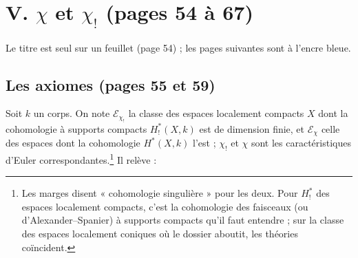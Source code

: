 \documentclass[11pt,a4paper]{article}
\begin{document}
\section*{V. $\chi$ et $\chi_!$ (pages 54 à 67)}

Le titre est seul sur un feuillet (page 54) ; les pages suivantes sont à
l'encre bleue.

\subsection*{Les axiomes (pages 55 et 59)}

Soit $k$ un corps. On note $\mathcal{E}_{\chi_!}$ la classe des espaces
localement compacts $X$ dont la cohomologie à supports compacts
$H^*_!(X,k)$ est de dimension finie, et $\mathcal{E}_\chi$ celle des espaces dont
la cohomologie $H^*(X,k)$ l'est ; $\chi_!$ et $\chi$ sont les
caractéristiques d'Euler correspondantes.\footnote{Les marges disent
« cohomologie singulière » pour les deux. Pour $H^*_!$ des espaces localement
compacts, c'est la cohomologie des faisceaux (ou d'Alexander--Spanier) à
supports compacts qu'il faut entendre ; sur la classe des espaces localement
coniques où le dossier aboutit, les théories coïncident.} Il relève :
\end{document}
